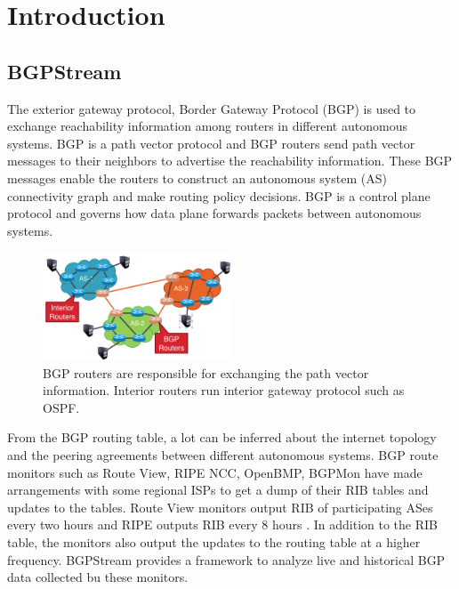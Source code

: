 \section{Introduction}\label{sec:introduction}
  \subsection{BGPStream}
 The exterior gateway protocol, Border Gateway Protocol (BGP) is used to exchange reachability information among routers in different autonomous systems. BGP is a path vector protocol and BGP routers send path vector messages to their neighbors to advertise the reachability information. These BGP messages enable the routers to construct an autonomous system (AS) connectivity graph and make routing policy decisions. BGP is a control plane protocol and governs how data plane forwards packets between autonomous systems. 
 \begin{figure}
	\includegraphics[width=0.5\textwidth]{Interior_and_BGP_routers.png}
	\caption{BGP routers are responsible for exchanging the path vector information. Interior routers run interior gateway protocol such as OSPF.}
\end{figure}
From the BGP routing table, a lot can be inferred about the internet topology and the peering agreements between different autonomous systems. BGP route monitors such as Route View, RIPE NCC, OpenBMP, BGPMon have made arrangements with some regional ISPs to get a dump of their RIB tables and updates to the tables. Route View monitors output RIB of participating ASes every two hours and RIPE outputs RIB every 8 hours \cite{orsini_bgpstream:_2016}. In addition to the RIB table, the monitors also output the updates to the routing table at a higher frequency. BGPStream provides a framework to analyze live and historical BGP data collected bu these monitors.  
